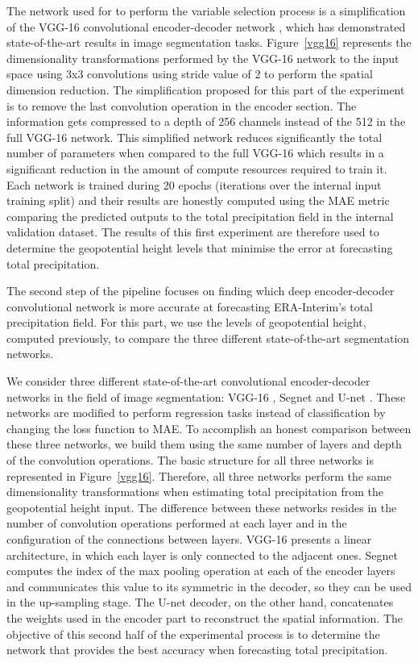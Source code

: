 \documentclass[twocol]{ametsoc}
\begin{document}
The network used for to perform the variable selection process is a simplification of the VGG-16 convolutional encoder-decoder network \citep{long2015fully}, which has demonstrated state-of-the-art results in image segmentation tasks. Figure~\ref{vgg16} represents the dimensionality transformations performed by the VGG-16 network to the input space using 3x3 convolutions using stride value of 2 to perform the spatial dimension reduction. The simplification proposed for this part of the experiment is to remove the last convolution operation in the encoder section. The information gets compressed to a depth of 256 channels instead of the 512 in the full VGG-16 network. This simplified network reduces significantly the total number of parameters when compared to the full VGG-16 which results in a significant reduction in the amount of compute resources required to train it. Each network is trained during 20 epochs (iterations over the internal input training split) and their results are honestly computed using the MAE metric comparing the predicted outputs to the total precipitation field in the internal validation dataset. The results of this first experiment are therefore used to determine the geopotential height levels that minimise the error at forecasting total precipitation. 

The second step of the pipeline focuses on finding which deep encoder-decoder convolutional network is more accurate at forecasting ERA-Interim's total precipitation field. For this part, we use the levels of geopotential height, computed previously, to compare the three different state-of-the-art segmentation networks.

We consider three different state-of-the-art convolutional encoder-decoder networks in the field of image segmentation: VGG-16 \citep{long2015fully}, Segnet \citep{badrinarayanan2017segnet} and U-net \citep{ronneberger2015u}. These networks are modified to perform regression tasks instead of classification by changing the loss function to MAE. To accomplish an honest comparison between these three networks, we build them using the same number of layers and depth of the convolution operations. The basic structure for all three networks is represented in Figure~\ref{vgg16}. Therefore, all three networks perform the same dimensionality transformations when estimating total precipitation from the geopotential height input. The difference between these networks resides in the number of convolution operations performed at each layer and in the configuration of the connections between layers. VGG-16 presents a linear architecture, in which each layer is only connected to the adjacent ones. Segnet computes the index of the max pooling operation at each of the encoder layers and communicates this value to its symmetric in the decoder, so they can be used in the up-sampling stage. The U-net decoder, on the other hand, concatenates the weights used in the encoder part to reconstruct the spatial information. The objective of this second half of the experimental process is to determine the network that provides the best accuracy when forecasting total precipitation.
\end{document}
